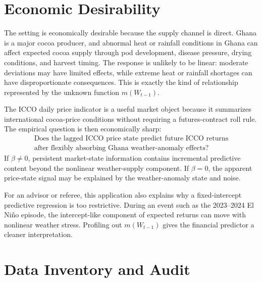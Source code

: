 \documentclass[11pt]{article}
\begin{document}
\section{Economic Desirability}

The setting is economically desirable because the supply channel is direct. Ghana is a major cocoa producer, and abnormal heat or rainfall conditions in Ghana can affect expected cocoa supply through pod development, disease pressure, drying conditions, and harvest timing. The response is unlikely to be linear: moderate deviations may have limited effects, while extreme heat or rainfall shortages can have disproportionate consequences. This is exactly the kind of relationship represented by the unknown function \(m(W_{t-1})\).

The ICCO daily price indicator is a useful market object because it summarizes international cocoa-price conditions without requiring a futures-contract roll rule. The empirical question is then economically sharp:
\[
    \begin{gathered}
    \text{Does the lagged ICCO price state predict future ICCO returns}\\
    \text{after flexibly absorbing Ghana weather-anomaly effects?}
    \end{gathered}
\]
If \(\beta\neq0\), persistent market-state information contains incremental predictive content beyond the nonlinear weather-supply component. If \(\beta=0\), the apparent price-state signal may be explained by the weather-anomaly state and noise.

For an advisor or referee, this application also explains why a fixed-intercept predictive regression is too restrictive. During an event such as the 2023--2024 El Ni\~no episode, the intercept-like component of expected returns can move with nonlinear weather stress. Profiling out \(m(W_{t-1})\) gives the financial predictor a cleaner interpretation.

\section{Data Inventory and Audit}
\end{document}
